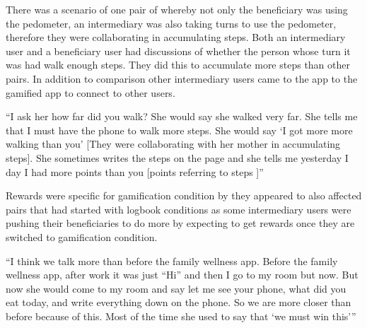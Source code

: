 \begin{enumerate}
There was a scenario of one pair of whereby not only the beneficiary was using the pedometer, an intermediary was also taking turns to use the pedometer, therefore they were collaborating in accumulating steps. Both an intermediary user and a beneficiary user had discussions of whether the person whose turn it was had walk enough steps. They did this to accumulate more steps than other pairs. In addition to comparison other intermediary users came to the app to the gamified app to connect to other users.

 {``I ask her how far did you walk?  She would say she walked very far. She tells me that I must have the phone to walk more steps. She would say `I got more more walking than you' [They were collaborating with her mother in accumulating steps]. She sometimes writes the steps on the page and she tells me yesterday I day I had more points than you [points referring to steps ]''} 

Rewards were specific for gamification condition by they appeared to also affected pairs that had started with logbook conditions as some intermediary users were pushing their beneficiaries to do more by expecting to get rewards once they are switched to gamification condition.

 {``I think we talk more than before the family wellness app. Before the family wellness app, after work it was just ``Hi'' and then I go to my room but now. But now she would come to my room  and say let me see your phone,  what did you eat today,  and write everything down on the phone. So we are more closer than before because of this. Most of the time she used to say that `we must win this'''} 


\end{enumerate}
